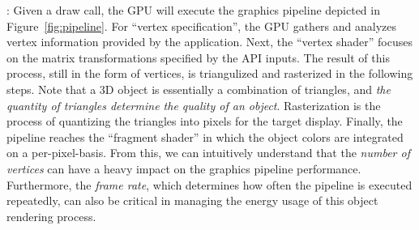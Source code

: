 
:
%
Given a draw call, the GPU will execute the graphics pipeline depicted in Figure~\ref{fig:pipeline}. For ``vertex specification'', the GPU gathers and analyzes vertex information provided by the application. Next, the ``vertex shader'' focuses on the matrix transformations specified by  the API inputs. The result of this process, still in the form of vertices,  is triangulized and rasterized in the following steps.
%
Note that a 3D object is essentially a combination of triangles, and 
\emph{the quantity of triangles determine the quality of an object}.
Rasterization is the process of quantizing the triangles into pixels for the
target display.
%
Finally, the pipeline reaches the ``fragment shader'' in which the object 
colors are integrated on a per-pixel-basis.
%
From this, we can intuitively understand that the \emph{number of vertices} can
have a heavy impact on the graphics pipeline performance. Furthermore, the 
\emph{frame rate}, which determines how often the pipeline is executed repeatedly,
can also be critical in managing the energy usage of this object rendering process. 